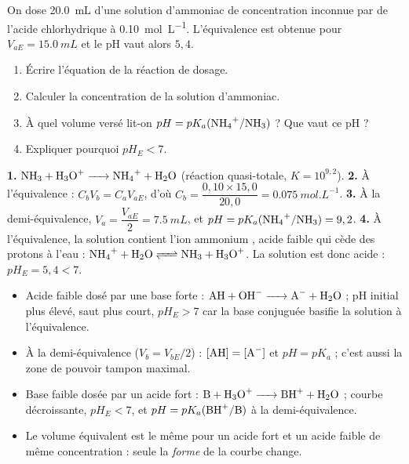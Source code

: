 \documentclass[11pt]{article}
\newcommand{\cle}[1]{{\popxbold\color{popdark}#1}}
\begin{document}
\begin{exercice}
On dose \SI{20,0}{mL} d'une solution d'ammoniac de concentration inconnue par de l'acide chlorhydrique à \SI{0,10}{mol.L^{-1}}. L'équivalence est obtenue pour $V_{aE} = \SI{15,0}{mL}$ et le pH vaut alors $5,4$.
\begin{enumerate}
\item Écrire l'équation de la réaction de dosage.
\item Calculer la concentration de la solution d'ammoniac.
\item À quel volume versé lit-on $pH = pK_a(\ce{NH4+}/\ce{NH3})$ ? Que vaut ce pH ?
\item Expliquer pourquoi $pH_E < 7$.
\end{enumerate}
\end{exercice}

\begin{corrige}
\textbf{1.} $\ce{NH3 + H3O+ -> NH4+ + H2O}$ (réaction quasi-totale, $K = 10^{9,2}$).
\textbf{2.} À l'équivalence : $C_b V_b = C_a V_{aE}$, d'où $C_b = \dfrac{0,10 \times 15,0}{20,0} = \SI{0,075}{mol.L^{-1}}$.
\textbf{3.} À la demi-équivalence, $V_a = \dfrac{V_{aE}}{2} = \SI{7,5}{mL}$, et $pH = pK_a(\ce{NH4+}/\ce{NH3}) = 9,2$.
\textbf{4.} À l'équivalence, la solution contient l'ion ammonium , acide faible qui cède des protons à l'eau : $\ce{NH4+ + H2O <=> NH3 + H3O+}$. La solution est donc acide : $pH_E = 5,4 < 7$.
\end{corrige}

\begin{aretenir}
\begin{itemize}
\item Acide faible dosé par une base forte : $\ce{AH + OH- -> A- + H2O}$ ; pH initial plus élevé, saut plus court, $pH_E > 7$ car la base conjuguée  basifie la solution à l'équivalence.
\item À la \cle{demi-équivalence} ($V_b = V_{bE}/2$) : $[\ce{AH}] = [\ce{A-}]$ et $pH = pK_a$ ; c'est aussi la zone de pouvoir tampon maximal.
\item Base faible dosée par un acide fort : $\ce{B + H3O+ -> BH+ + H2O}$ ; courbe décroissante, $pH_E < 7$, et $pH = pK_a(\ce{BH+}/\ce{B})$ à la demi-équivalence.
\item Le volume équivalent est le même pour un acide fort et un acide faible de même concentration : seule la \emph{forme} de la courbe change.
\end{itemize}
\end{aretenir}
\end{document}
